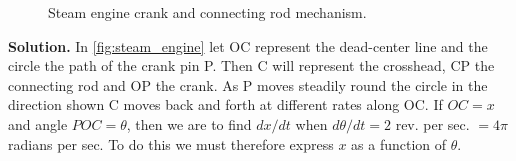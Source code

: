 \begin{figure}[h]
    \centering
    \caption{Steam engine crank and connecting rod mechanism.}
    \label{fig:steam_engine}
\end{figure}

\noindent\textbf{Solution.} In \autoref{fig:steam_engine} let OC represent the dead-center line and the circle the path of the crank pin P. Then C will represent the crosshead, CP the connecting rod and OP the crank. As P moves steadily round the circle in the direction shown C moves back and forth at different rates along OC. If $OC=x$ and angle $POC=\theta$, then we are to find $dx/dt$ when $d\theta/dt=2$ rev. per sec. $=4\pi$ radians per sec. To do this we must therefore express $x$ as a function of $\theta$.

